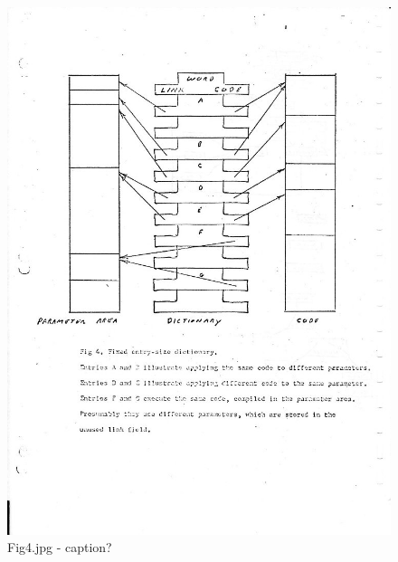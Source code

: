 \documentclass[b5paper, oneside]{book}
\begin{document}
\begin{figure}[ht!]
\centering
\includegraphics[width=140mm]{Fig4.jpg}
\caption{Fig4.jpg - caption?\label{exampleLabel3}}
\end{figure}

\end{document}
